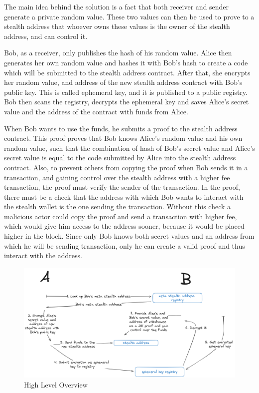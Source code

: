 The main idea behind the solution is a fact that both
receiver and sender generate a private random value. These two values can then
be used to prove to a stealth address that whoever owns these values
is the owner of the stealth address, and can control it.

Bob, as a receiver, only publishes the hash of his random value. Alice then
generates her own random value and hashes it with Bob's hash to create a
code which will be submitted to the stealth address contract. After that, she
encrypts her random value, and address of the new stealth address
contract with Bob's public key. This is called ephemeral key, and it is published
to a public registry. Bob then scans the registry, decrypts the ephemeral key and
saves Alice's secret value and the address of the contract with funds from Alice.

When Bob wants to use the funds, he submits a proof to the stealth address
contract. This proof proves that Bob knows Alice's random value and his own
random value, such that the combination of hash of Bob's secret value and
Alice's secret value is equal to the code submitted by Alice into the stealth
address contract. Also, to prevent others from copying the proof when Bob
sends it in a transaction, and gaining control over the stealth address with a higher fee
transaction, the proof must verify the sender of the transaction. In the
proof, there must be a check that the address with which Bob wants to interact
with the stealth wallet is the one sending the transaction. Without this check
a malicious actor could copy the proof and send a transaction with higher fee,
which would give him access to the address sooner, because it would be placed
higher in the block. Since only Bob knows both secret values and an address
from which he will be sending transaction, only he can create a valid
proof and thus interact with the address.

\begin{figure}[h]
    \centering
    \includegraphics[scale=0.18]{assets/images/high-level.png}
    \caption{High Level Overview}
    \label{fig:hig-level}
    \vspace{0.5cm}
\end{figure}

